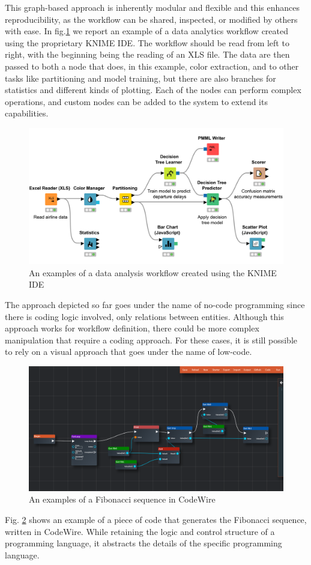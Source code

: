 \documentclass[a4paper,12pt]{article}
\begin{document}
This graph-based approach is inherently modular and flexible and this enhances reproducibility, as the workflow can be shared, inspected, or modified by others with ease.
In fig.\ref{nocode-data} we report an example of a data analytics workflow created using the proprietary KNIME IDE. The workflow should be read from left to right, with the beginning being the reading of an XLS file. The data are then passed to both a node that does, in this example, color extraction, and to other tasks like partitioning and model training, but there are also branches for statistics and different kinds of plotting. Each of the nodes can perform complex operations, and custom nodes can be added to the system to extend its capabilities. 
\begin{figure}
\label{nocode-data}
\includegraphics[width=400pt]{nocode-data.png}
\caption{An examples of a data analysis workflow created using the KNIME IDE}
\end{figure}

The approach depicted so far goes under the name of no-code programming since there is coding logic involved, only relations between entities. Although this approach works for workflow definition, there could be more complex manipulation that require a coding approach. For these cases, it is still possible to rely on a visual approach that goes under the name of low-code. 
\begin{figure}
\label{lowcode}
\includegraphics[width=400pt]{lowcode.png}
\caption{An examples of a Fibonacci sequence in CodeWire}
\end{figure}
Fig. \ref{lowcode} shows an example of a piece of code that generates the Fibonacci sequence, written in CodeWire. While retaining the logic and control structure of a programming language, it abstracts the details of the specific programming language. 
\end{document}
